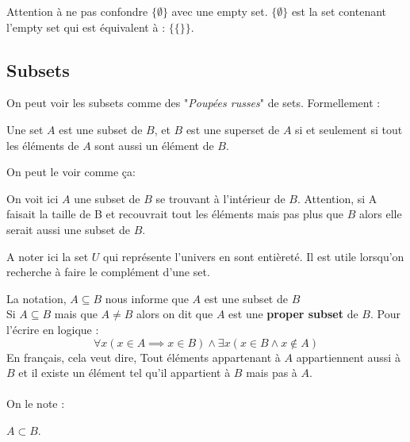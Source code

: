 Attention à ne pas confondre $\{\emptyset\}$ avec une empty set. $\{\emptyset\}$ est la set contenant l'empty set qui est équivalent à : $\{\{\}\}$.

\subsection{Subsets}
On peut voir les subsets comme des "\textit{Poupées russes}" de sets. Formellement : 
\begin{definition}[Subset]
    Une set $A$ est une subset de $B$, et $B$ est une superset de $A$ si et seulement si tout les éléments de $A$ sont aussi un élément de $B$.
\end{definition}
On peut le voir comme ça: 

\begin{center}
    
\end{center}

On voit ici $A$ une subset de $B$ se trouvant à l'intérieur de $B$. Attention, si A faisait la taille de B et recouvrait tout les éléments mais pas plus que $B$ alors elle serait aussi une subset de $B$. 
\begin{framedremark}
    A noter ici la set $U$ qui représente l'univers en sont entièreté. Il est utile lorsqu'on recherche à faire le complément d'une set.
\end{framedremark}

La notation, $A \subseteq B $ nous informe que $A$ est une subset de $B$
\\
Si $A \subseteq B$ mais que $A \neq B$ alors on dit que $A$ est une \textbf{proper subset} de $B$. Pour l'écrire en logique : 
\begin{equation*}
    \forall x (x\in A \implies x \in B) \wedge \exists x (x \in B \wedge x \notin A)
\end{equation*}
En français, cela veut dire, Tout éléments appartenant à $A$ appartiennent aussi à $B$ et il existe un élément tel qu'il appartient à $B$ mais pas à $A$.
\\
\\
On le note :
\begin{center}
 $A \subset B$.
\end{center}

